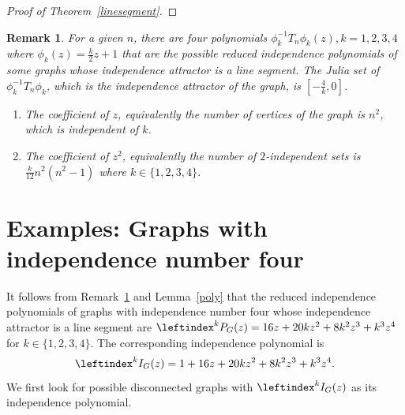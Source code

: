 \documentclass[12pt,a4paper]{article}
\theoremstyle{plain}
\newtheorem{rem}{Remark}[section]
\numberwithin{equation}{section}
\begin{document}
\begin{proof}[Proof of Theorem~\ref{linesegment}]
  \end{proof}
  
   
  \begin{rem} 
    For a given $n$, there are four polynomials $ \phi_{k}^{-1} T_n \phi_{k} (z), k=1,2,3,4$ where $\phi_{k}(z)=\frac{k}{2}z+1$ that are the possible reduced independence polynomials of some graphs whose independence attractor is a line segment. The Julia set of $\phi_{k}^{-1} T_n \phi_{k}$, which is the independence attractor of the graph, is $[-\frac{4}{k},0]$.
  		\begin{enumerate}[label=(\roman{*})]
  			\item  The coefficient of $z$, equivalently the number of vertices of the graph is $n^2$, which is independent of $k$.
  			\item The coefficient of $z^2$, equivalently the number of $2$-independent sets is $\frac{k}{12}n^2(n^2-1)$ where $k \in \{1,2,3,4\}$.
  			
  		\end{enumerate}
  	 
   \label{indpoly}
  \end{rem}
  
  
 \section{Examples: Graphs with independence number four}
 \label{examples}
It follows from Remark~\ref{indpoly} and  Lemma~\ref{poly} that 
 the reduced independence polynomials of graphs with independence number four whose independence attractor is a line segment are  $\leftindex^k{P}_G(z)=16z+20kz^2+8k^2z^3+k^3z^4$ for $k\in \{1,2,3,4\}$. The corresponding independence polynomial is 
 \begin{equation}
 	 \leftindex^k{I}_G(z) = 1+16z+20kz^2+8k^2z^3+k^3z^4.
 	 \label{indpoly-form}
 \end{equation}
  We first look for possible disconnected graphs with \(\leftindex^k{I}_G(z)\) as its independence polynomial.
\end{document}
